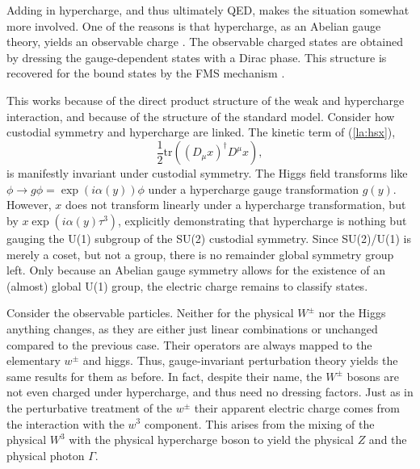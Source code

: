\documentclass[final,12pt]{article}
\newcommand*{\no}{\noindent}
\newcommand*{\be}{\begin{equation}}
\newcommand*{\ee}{\end{equation}}
\newcommand*{\pref}[1]{(\ref{#1})}
\newcommand*{\nn}{\nonumber}
\newcommand*{\tr}{\mathrm{tr}}
\newcommand*{\1}{1\!\!\!\bot}
\begin{document}
Adding in hypercharge, and thus ultimately QED, makes the situation somewhat more involved. One of the reasons is that hypercharge, as an Abelian gauge theory, yields an observable charge \cite{Haag:1992hx}. The observable charged states are obtained by dressing the gauge-dependent states with a Dirac phase. This structure is recovered for the bound states by the FMS mechanism \cite{Frohlich:1980gj,Frohlich:1981yi,Shrock:1985ur,Shrock:1986av}.

This works because of the direct product structure of the weak and hypercharge interaction, and because of the structure of the standard model. Consider how custodial symmetry and hypercharge are linked. The kinetic term of \pref{la:hsx},
\be
\frac{1}{2}\tr\left((D_\mu x)^\dagger D^\mu x\right)\nn,
\ee
\no is manifestly invariant under custodial symmetry. The Higgs field transforms like $\phi\to g\phi=\exp(i\alpha(y))\phi$ under a hypercharge gauge transformation $g(y)$. However, $x$ does not transform linearly under a hypercharge transformation, but by $x\exp(i\alpha(y)\tau^3)$, explicitly demonstrating that hypercharge is nothing but gauging the U(1) subgroup of the SU(2) custodial symmetry. Since SU(2)/U(1) is merely a coset, but not a group, there is no remainder global symmetry group left. Only because an Abelian gauge symmetry allows for the existence of an (almost) global U(1) group, the electric charge remains to classify states.

Consider the observable particles. Neither for the physical $W^\pm$ nor the Higgs anything changes, as they are either just linear combinations or unchanged compared to the previous case. Their operators are always mapped to the elementary $w^\pm$ and higgs. Thus, gauge-invariant perturbation theory yields the same results for them as before. In fact, despite their name, the $W^\pm$ bosons are not even charged under hypercharge, and thus need no dressing factors. Just as in the perturbative treatment of the $w^\pm$ \cite{Bohm:2001yx} their apparent electric charge comes from the interaction with the $w^3$ component. This arises from the mixing of the physical $W^3$ with the physical hypercharge boson to yield the physical $Z$ and the physical photon $\Gamma$.
\end{document}
